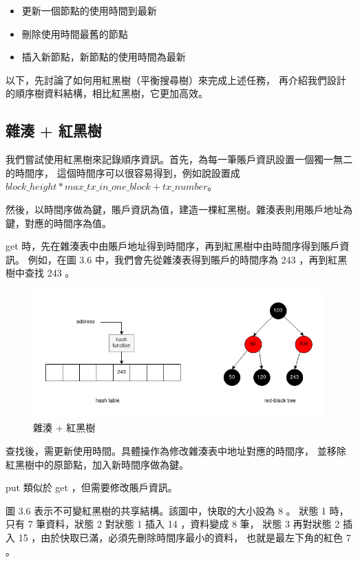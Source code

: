 \begin{itemize}
  \item 更新一個節點的使用時間到最新
  \item 刪除使用時間最舊的節點
  \item 插入新節點，新節點的使用時間為最新
\end{itemize}

以下，先討論了如何用紅黑樹\cite{guibas1978dichromatic}（平衡搜尋樹）來完成上述任務，
再介紹我們設計的順序樹資料結構，相比紅黑樹，它更加高效。

\subsection{雜湊 + 紅黑樹}

我們嘗試使用紅黑樹來記錄順序資訊。首先，為每一筆賬戶資訊設置一個獨一無二的時間序，
這個時間序可以很容易得到，例如說設置成 $block\_height * max\_tx\_in\_one\_block + tx\_number$。

然後，以時間序做為鍵，賬戶資訊為值，建造一棵紅黑樹。雜湊表則用賬戶地址為鍵，對應的時間序為值。

get 時，先在雜湊表中由賬戶地址得到時間序，再到紅黑樹中由時間序得到賬戶資訊。
例如，在圖 3.6 中，我們會先從雜湊表得到賬戶的時間序為 243 ，再到紅黑樹中查找 243 。

\begin{figure}[h!]
\includegraphics[width=\textwidth]{雜湊紅黑樹}
\caption{雜湊 + 紅黑樹}
\end{figure}

查找後，需更新使用時間。具體操作為修改雜湊表中地址對應的時間序，
並移除紅黑樹中的原節點，加入新時間序做為鍵。

put 類似於 get ，但需要修改賬戶資訊。

圖 3.6 表示不可變紅黑樹的共享結構。該圖中，快取的大小設為 8 。
狀態 1 時，只有 7 筆資料，狀態 2 對狀態 1 插入 14 ，資料變成 8 筆，
狀態 3 再對狀態 2 插入 15 ，由於快取已滿，必須先刪除時間序最小的資料，
也就是最左下角的紅色 7 。

